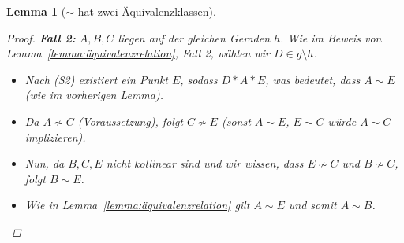 \documentclass[a4paper,12pt]{article}
\theoremstyle{break}
\newtheorem{lemma}[definition]{Lemma}
\begin{document}
\begin{lemma}[$\sim$ hat zwei Äquivalenzklassen]
\begin{proof}
\textbf{Fall 2:} $A, B, C$ liegen auf der gleichen Geraden $h$.  
Wie im Beweis von Lemma~\ref{lemma:äquivalenzrelation}, Fall 2, wählen wir $D \in g \setminus h$.  
\begin{itemize}
  \item Nach (S2) existiert ein Punkt $E$, sodass $D * A * E$, was bedeutet, dass $A \sim E$ (wie im vorherigen Lemma).
  \item Da $A \not\sim C$ (Voraussetzung), folgt $C \not\sim E$ (sonst $A \sim E$, $E \sim C$ würde $A \sim C$ implizieren).
  \item Nun, da $B, C, E$ nicht kollinear sind und wir wissen, dass $E \not\sim C$ und $B \not\sim C$, folgt $B \sim E$.
  \item Wie in Lemma~\ref{lemma:äquivalenzrelation} gilt $A \sim E$ und somit $A \sim B$.
\end{itemize}
\end{proof}
\end{lemma}
\end{document}

